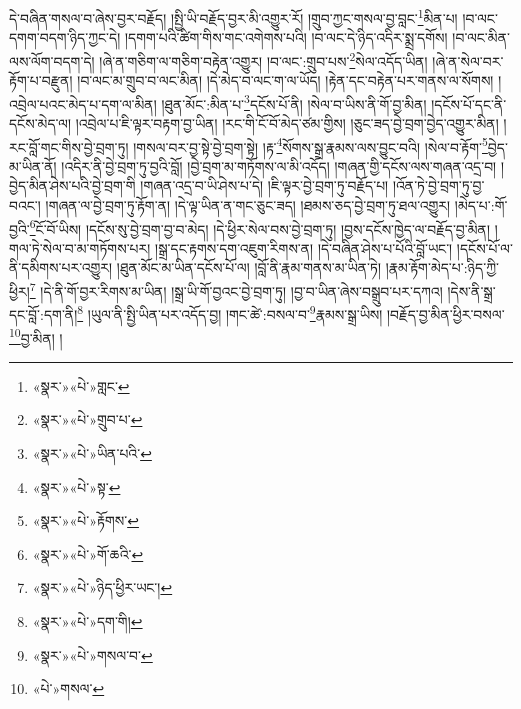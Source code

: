 དེ་བཞིན་གསལ་བ་ཞེས་བྱར་བརྗོད། །སྤྱི་ཡི་བརྗོད་བྱར་མི་འགྱུར་རོ། །གྲུབ་ཀྱང་གསལ་བྱ་བླང་\footnote{«སྣར་»«པེ་»གླང་}མིན་པ། །བ་ལང་དགག་བདག་ཉིད་ཀྱང་དེ། །དགག་པའི་ཚིག་གིས་གང་འགེགས་པའི། །བ་ལང་དེ་ཉིད་འདིར་སྨྲ་དགོས། །བ་ལང་མིན་ལས་ལོག་བདག་དེ། །ཞེ་ན་གཅིག་ལ་གཅིག་བརྟེན་འགྱུར། །བ་ལང་:གྲུབ་པས་\footnote{«སྣར་»«པེ་»གྲུབ་པ་}སེལ་འདོད་ཡིན། །ཞེ་ན་སེལ་བར་རྟོག་པ་བརྫུན། །བ་ལང་མ་གྲུབ་བ་ལང་མིན། །དེ་མེད་བ་ལང་ག་ལ་ཡོད། །རྟེན་དང་བརྟེན་པར་གནས་ལ་སོགས། །འབྲེལ་པའང་མེད་པ་དག་ལ་མིན། །ཐུན་མོང་:མིན་པ་\footnote{«སྣར་»«པེ་»ཡིན་པའི་}དངོས་པོ་ནི། །སེལ་བ་ཡིས་ནི་གོ་བྱ་མིན། །དངོས་པོ་དང་ནི་དངོས་མེད་ལ། །འབྲེལ་པ་ཇི་ལྟར་བརྟག་བྱ་ཡིན། །རང་གི་ངོ་བོ་མེད་ཙམ་གྱིས། །ཅུང་ཟད་བྱེ་བྲག་བྱེད་འགྱུར་མིན། །རང་བློ་གང་གིས་བྱེ་བྲག་ཏུ། །གསལ་བར་བྱ་སྟེ་བྱེ་བྲག་སྟེ། །རྟ་\footnote{«སྣར་»«པེ་»སྟ་}སོགས་སྒྲ་རྣམས་ལས་བྱུང་བའི། །སེལ་བ་རྟོག་\footnote{«སྣར་»«པེ་»རྟོགས་}བྱེད་མ་ཡིན་ནོ། །འདིར་ནི་བྱེ་བྲག་ཏུ་བྱའི་བློ། །བྱེ་བྲག་མ་གཏོགས་ལ་མི་འདོད། །གཞན་གྱི་དངོས་ལས་གཞན་འདྲ་བ། །བྱེད་མིན་ཤེས་པའི་བྱེ་བྲག་གི །གཞན་འདྲ་བ་ཡི་ཤེས་པ་དེ། །ཇི་ལྟར་བྱེ་བྲག་ཏུ་བརྗོད་པ། །འོན་ཏེ་བྱེ་བྲག་ཏུ་བྱ་བའང་། །གཞན་ལ་བྱེ་བྲག་ཏུ་རྟོག་ན། །དེ་ལྟ་ཡིན་ན་གང་ཅུང་ཟད། །ཐམས་ཅད་བྱེ་བྲག་ཏུ་ཐལ་འགྱུར། །མེད་པ་:གོ་བྱའི་\footnote{«སྣར་»«པེ་»གོ་ཆའི་}ངོ་བོ་ཡིས། །དངོས་སུ་བྱེ་བྲག་བྱ་བ་མེད། །དེ་ཕྱིར་སེལ་བས་བྱེ་བྲག་ཏུ། །བྱས་དངོས་ཁྱེད་ལ་བརྗོད་བྱ་མིན། །གལ་ཏེ་སེལ་བ་མ་གཏོགས་པར། །སྒྲ་དང་རྟགས་དག་འཇུག་རིགས་ན། །དེ་བཞིན་ཤེས་པ་པོའི་བློ་ཡང་། །དངོས་པོ་ལ་ནི་དམིགས་པར་འགྱུར། །ཐུན་མོང་མ་ཡིན་དངོས་པོ་ལ། །བློ་ནི་རྣམ་གནས་མ་ཡིན་ཏེ། །རྣམ་རྟོག་མེད་པ་:ཉིད་ཀྱི་ཕྱིར།\footnote{«སྣར་»«པེ་»ཉིད་ཕྱིར་ཡང་།} །དེ་ནི་གོ་བྱར་རིགས་མ་ཡིན། །སྒྲ་ཡི་གོ་བྱའང་བྱེ་བྲག་ཏུ། །བྱ་བ་ཡིན་ཞེས་བསྒྲུབ་པར་དཀའ། །དེས་ནི་སྒྲ་དང་བློ་:དག་ནི།\footnote{«སྣར་»«པེ་»དག་གི།} །ཡུལ་ནི་སྤྱི་ཡིན་པར་འདོད་བྱ། །གང་ཚེ་:བསལ་བ་\footnote{«སྣར་»«པེ་»གསལ་བ་}རྣམས་སྒྲ་ཡིས། །བརྗོད་བྱ་མིན་ཕྱིར་བསལ་\footnote{«པེ་»གསལ་}བྱ་མིན། །
